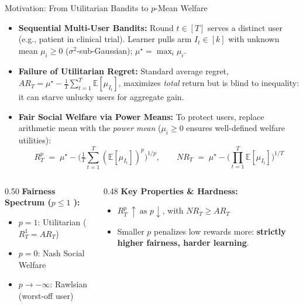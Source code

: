 \documentclass[11pt]{beamer}
\newcommand{\E}{\mathbb{E}}
\newcommand{\mus}{\mu^{\star}}
\begin{document}
\begin{frame}{Motivation: From Utilitarian Bandits to $p$-Mean Welfare}
  \small
  \begin{itemize}
    \item \textbf{Sequential Multi-User Bandits:} Round $t \in [T]$ serves a distinct user (e.g., patient in clinical trial). Learner pulls arm $I_t \in [k]$ with unknown mean $\mu_i \ge 0$ ($\sigma^2$-sub-Gaussian); $\mus = \max_i \mu_i$.
    \item \textbf{Failure of Utilitarian Regret:} Standard average regret,
          $AR_T = \mus - \frac{1}{T}\sum_{t=1}^{T}\E[\mu_{I_t}]$,
          maximizes \emph{total} return but is blind to inequality: it can starve unlucky users for aggregate gain.
    \item \textbf{Fair Social Welfare via Power Means:} To protect users, replace arithmetic mean with the \emph{power mean} ($\mu_i \ge 0$ ensures well-defined welfare utilities):
          \[
            R_T^{p} \;=\; \mus - \Big(\tfrac1T\sum_{t=1}^{T}(\E[\mu_{I_t}])^p\Big)^{1/p},
            \qquad
            NR_T \;=\; \mus - \Big(\prod_{t=1}^{T}\E[\mu_{I_t}]\Big)^{1/T}
          \]
  \end{itemize}

  \begin{columns}[T]
    \begin{column}{0.50\textwidth}
      \footnotesize
      \textbf{Fairness Spectrum ($p \le 1$ \cite{moulin2004,sarkar2025}):}
      \begin{itemize}
        \item $p = 1$: Utilitarian ($R^1_T = AR_T$)
        \item $p = 0$: Nash Social Welfare
        \item $p \to -\infty$: Rawlsian (worst-off user)
      \end{itemize}
    \end{column}
    \begin{column}{0.48\textwidth}
      \footnotesize
      \textbf{Key Properties \& Hardness:}
      \begin{itemize}
        \item $R_T^{p}\ \uparrow\ \text{as } p\downarrow$, with $NR_T \ge AR_T$
        \item Smaller $p$ penalizes low rewards more: \textbf{strictly higher fairness, harder learning}.
      \end{itemize}
    \end{column}
  \end{columns}
\end{frame}
\end{document}
